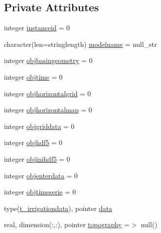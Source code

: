 \subsection*{Private Attributes}
\begin{DoxyCompactItemize}
\item 
integer \mbox{\hyperlink{structmoduleirrigation_1_1t__irrigation_a18f07e4f30b6f3b366363ccf2e4989da}{instanceid}} = 0
\item 
character(len=stringlength) \mbox{\hyperlink{structmoduleirrigation_1_1t__irrigation_a9eae95bffa08a5aa54aec395278cbec0}{modelname}} = null\+\_\+str
\item 
integer \mbox{\hyperlink{structmoduleirrigation_1_1t__irrigation_a53143fd00b605a1b9238dfb14beea49c}{objbasingeometry}} = 0
\item 
integer \mbox{\hyperlink{structmoduleirrigation_1_1t__irrigation_a7bb948ee03fa4783a716d481376af517}{objtime}} = 0
\item 
integer \mbox{\hyperlink{structmoduleirrigation_1_1t__irrigation_a0bd3419fd8bdf7ec556eec1672653c26}{objhorizontalgrid}} = 0
\item 
integer \mbox{\hyperlink{structmoduleirrigation_1_1t__irrigation_a636e524ad394e3e134b1b6007dc5898d}{objhorizontalmap}} = 0
\item 
integer \mbox{\hyperlink{structmoduleirrigation_1_1t__irrigation_a639764baa90cdf6d195c68843f0bed14}{objgriddata}} = 0
\item 
integer \mbox{\hyperlink{structmoduleirrigation_1_1t__irrigation_aa8efa7e8d8cf0be1f2135108676e3503}{objhdf5}} = 0
\item 
integer \mbox{\hyperlink{structmoduleirrigation_1_1t__irrigation_aa5f9a50248e1cabfd0c957a64d60d5f0}{objinihdf5}} = 0
\item 
integer \mbox{\hyperlink{structmoduleirrigation_1_1t__irrigation_abacd82795a850603de140d0853053561}{objenterdata}} = 0
\item 
integer \mbox{\hyperlink{structmoduleirrigation_1_1t__irrigation_a47fd8ff88e4249b4f719a7a48f094117}{objtimeserie}} = 0
\item 
type(\mbox{\hyperlink{structmoduleirrigation_1_1t__irrigationdata}{t\+\_\+irrigationdata}}), pointer \mbox{\hyperlink{structmoduleirrigation_1_1t__irrigation_a21d0871f25e3891e56d009bc60bffe80}{data}}
\item 
real, dimension(\+:,\+:), pointer \mbox{\hyperlink{structmoduleirrigation_1_1t__irrigation_a7a8e25a53bee78f9b4970fd4ae66604a}{topography}} =$>$ null()
\item 

\end{DoxyCompactItemize}
